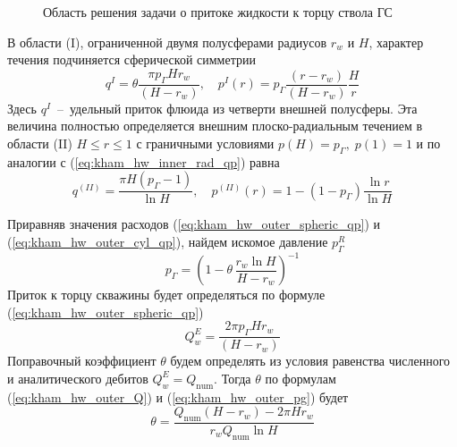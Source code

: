 \documentclass{article}
\begin{document}
\begin{figure}[H]
	\centering
	
	\caption{Область решения задачи о притоке жидкости к торцу ствола ГС}
	\label{fig:kham_hw_outer_scheme}
\end{figure}

В области (I), ограниченной двумя полусферами радиусов $r_w$ и $H$, характер течения подчиняется сферической симметрии
\begin{equation}
	\displaystyle
	q^I = \theta \dfrac{\pi p_{\Gamma} H r_w}{\left(H - r_w\right)} , \quad
	p^I(r) = p_{\Gamma}\dfrac{\left(r-r_w\right)}{\left(H-r_w\right)}\dfrac{H}{r}
	\label{eq:kham_hw_outer_spheric_qp}
\end{equation}
Здесь $q^I$~--~удельный приток флюида из четверти внешней полусферы.
Эта величина полностью определяется внешним плоско-радиальным течением
в области (II) $H \le r \le 1$ с граничными условиями $p(H) = p_{\Gamma}, \; p(1)= 1$
и по аналогии с (\ref{eq:kham_hw_inner_rad_qp}) равна
\begin{equation}
	\displaystyle
	q^{(II)} = \dfrac{\pi H \left( p_{\Gamma} - 1 \right)}{ \ln{H }}, \quad
	p^{(II)}(r) = 1 - \left(1-p_{\Gamma}\right) \dfrac{\ln{r}}{\ln{H}}
	\label{eq:kham_hw_outer_cyl_qp}
\end{equation}

Приравняв значения расходов (\ref{eq:kham_hw_outer_spheric_qp}) и (\ref{eq:kham_hw_outer_cyl_qp}),
найдем искомое давление $p^R_{\Gamma}$
\begin{equation}
	\displaystyle
	p_{\Gamma} = \left( 1 - \theta \,\dfrac{r_w \ln H}{H - r_w} \right)^{-1} %
	\label{eq:kham_hw_outer_pg}
\end{equation}
Приток к торцу скважины будет определяться по формуле (\ref{eq:kham_hw_outer_spheric_qp})
\begin{equation}
	\displaystyle
	Q_w^E = \dfrac{2\pi p_{\Gamma} H r_w}{\left(H - r_w\right)}
	\label{eq:kham_hw_outer_Q}
\end{equation}
Поправочный коэффициент $\theta$ будем определять из условия равенства численного и аналитического дебитов $Q_w^E = Q_{\text{num}}$.
Тогда $\theta$ по формулам (\ref{eq:kham_hw_outer_Q}) и (\ref{eq:kham_hw_outer_pg}) будет
\begin{equation}
	\displaystyle
	\theta = \dfrac{Q_{\text{num}} \left(H - r_w \right) - 2 \pi H r_w}{r_w Q_{\text{num}} \ln{H}}
	\label{eq:kham_hw_outer_theta}
\end{equation}
\end{document}
